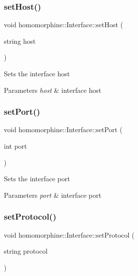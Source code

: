 \subsubsection{\texorpdfstring{setHost()}{setHost()}}
{\footnotesize\ttfamily void homomorphine\+::\+Interface\+::set\+Host (\begin{DoxyParamCaption}\item[{string}]{host }\end{DoxyParamCaption})}

Sets the interface host


\begin{DoxyParams}{Parameters}
{\em host} & interface host \\
\hline
\end{DoxyParams}
\mbox{\label{classhomomorphine_1_1_interface_a3027f79fe84b8ce6d8d3084771c41e4f}} 
\subsubsection{\texorpdfstring{setPort()}{setPort()}}
{\footnotesize\ttfamily void homomorphine\+::\+Interface\+::set\+Port (\begin{DoxyParamCaption}\item[{int}]{port }\end{DoxyParamCaption})}

Sets the interface port


\begin{DoxyParams}{Parameters}
{\em port} & interface port \\
\hline
\end{DoxyParams}
\mbox{\label{classhomomorphine_1_1_interface_a7c4a929fc543c3a5438a5d6f6b3dbc16}} 
\subsubsection{\texorpdfstring{setProtocol()}{setProtocol()}}
{\footnotesize\ttfamily void homomorphine\+::\+Interface\+::set\+Protocol (\begin{DoxyParamCaption}\item[{string}]{protocol }\end{DoxyParamCaption})}

